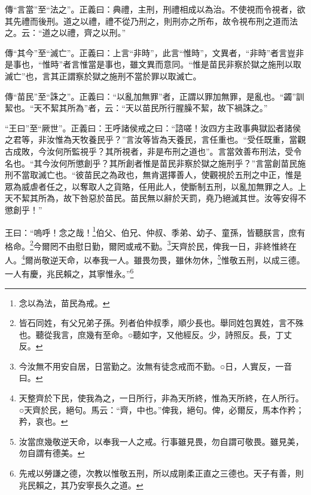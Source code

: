 {\noindent\zhuan{}\fzbyks 傳“言當”至“法之”。正義曰：典禮，主刑，刑禮相成以為治。不使視而令視者，欲其先禮而後刑。道之以禮，禮不從乃刑之，則刑亦之所布，故令視布刑之道而法之。云：“道之以禮，齊之以刑。” \par}

{\noindent\zhuan{}\fzbyks 傳“其今”至“滅亡”。正義曰：上言“非時”，此言“惟時”，文異者，“非時”者言豈非是事也，“惟時”者言惟當是事也，雖文異而意同。“惟是苗民非察於獄之施刑以取滅亡”也，言其正謂察於獄之施刑不當於罪以取滅亡。 \par}

{\noindent\zhuan{}\fzbyks 傳“苗民”至“誅之”。正義曰：“以亂加無罪”者，正謂以罪加無罪，是亂也。“蠲”訓絜也。“天不絜其所為”者，云：“天以苗民所行腥臊不絜，故下禍誅之。” \par}

{\noindent\shu{}\fzkt “王曰”至“厥世”。正義曰：王呼諸侯戒之曰：“諮嗟！汝四方主政事典獄訟者諸侯之君等，非汝惟為天牧養民乎？”言汝等皆為天養民，言任重也。“受任既重，當觀古成敗，今汝何所監視乎？其所視者，非是布刑之道也”。言當效善布刑法，受令名也。“其今汝何所懲創乎？其所創者惟是苗民非察於獄之施刑乎？”言當創苗民施刑不當取滅亡也。“彼苗民之為政也，無肯選擇善人，使觀視於五刑之中正，惟是眾為威虐者任之，以奪取人之貨賂，任用此人，使斷制五刑，以亂加無罪之人。上天不絜其所為，故下咎惡於苗民。苗民無以辭於天罰，堯乃絕滅其世。汝等安得不懲創乎！” \par}

王曰：“嗚呼！念之哉！\footnote{念以為法，苗民為戒。}伯父、伯兄、仲叔、季弟、幼子、童孫，皆聽朕言，庶有格命。\footnote{皆石同姓，有父兄弟子孫。列者伯仲叔季，順少長也。舉同姓包異姓，言不殊也。聽從我言，庶幾有至命。○聽如字，又他經反。少，詩照反。長，丁丈反。}今爾罔不由慰日勤，爾罔或戒不勤。\footnote{今汝無不用安自居，日當勤之。汝無有徒念戒而不勤。○日，人實反，一音曰。}天齊於民，俾我一日，非終惟終在人。\footnote{天整齊於下民，使我為之，一日所行，非為天所終，惟為天所終，在人所行。○天齊於民，絕句。馬云：“齊，中也。”俾我，絕句。俾，必爾反，馬本作矜；矜，哀也。}爾尚敬逆天命，以奉我一人。雖畏勿畏，雖休勿休，\footnote{汝當庶幾敬逆天命，以奉我一人之戒。行事雖見畏，勿自謂可敬畏。雖見美，勿自謂有德美。}惟敬五刑，以成三德。一人有慶，兆民賴之，其寧惟永。”\footnote{先戒以勞謙之德，次教以惟敬五刑，所以成剛柔正直之三德也。天子有善，則兆民賴之，其乃安寧長久之道。}


